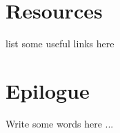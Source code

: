 \newpage



\hypertarget{Resources}{%
\section{Resources}\label{resources}}

list some useful links here

\newpage



\hypertarget{Epilogue}{%
\section{Epilogue}\label{epilogue}}

Write some words here ...